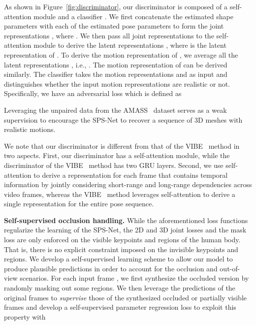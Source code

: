 \documentclass[times,referee,twocolumn,final,authoryear]{elsarticle}
\newcommand{\heading}[1]{\noindent\textbf{#1}}
\begin{document}
As shown in Figure~\ref{fig:discriminator}, our discriminator  is composed of a self-attention module  and a classifier .
We first concatenate the estimated shape parameters  with each of the estimated pose parameters  to form the joint representations , where .
We then pass all joint representations  to the self-attention module  to derive the latent representations , where  is the latent representation of .
To derive the motion representation  of , we average all the latent representations , i.e., .
The motion representation  of  can be derived similarly.
The classifier  takes the motion representations  and  as input and distinguishes whether the input motion representations are realistic or not.
Specifically, we have an adversarial loss  which is defined as
\vspace{-1.5mm}  

Leveraging the unpaired data from the AMASS~\citep{AMASS} dataset serves as a weak supervision to encourage the SPS-Net to recover a sequence of 3D meshes with realistic motions.

We note that our discriminator  is different from that of the VIBE~\citep{VIBE} method in two aspects.
First, our discriminator has a self-attention module, while the discriminator of the VIBE~\citep{VIBE} method has two GRU layers.
Second, we use self-attention to derive a representation for each frame that contains temporal information by jointly considering short-range and long-range dependencies across video frames, whereas the VIBE~\citep{VIBE} method leverages self-attention to derive a single representation for the entire pose sequence.

\heading{Self-supervised occlusion handling.}
While the aforementioned loss functions regularize the learning of the SPS-Net, the 2D and 3D joint losses and the mask loss are only enforced on the visible keypoints and regions of the human body.
That is, there is no explicit constraint imposed on the invisible keypoints and regions.
We develop a self-supervised learning scheme to allow our model to produce plausible predictions in order to account for the occlusion and out-of-view scenarios. 
For each input frame , we first synthesize the occluded version  by randomly masking out some regions.
We then leverage the predictions of the original frames to \emph{supervise} those of the synthesized occluded or partially visible frames and develop a self-supervised parameter regression loss  to exploit this property with 
\vspace{-4.0mm} 
\end{document}
